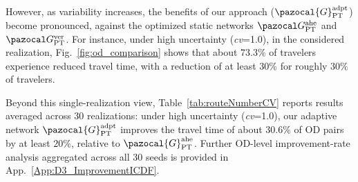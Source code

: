 \documentclass[a4paper,fleqn]{cas-sc}
\begin{document}
However, as variability increases, the benefits of our approach ($\pazocal{G}_{\text{PT}}^{\text{adpt}}$) become pronounced, against the optimized static networks $\pazocal G_\text{PT}^\text{ahe}$ and $\pazocal G_\text{PT}^\text{ver}$.
%
For instance, under high uncertainty (\textit{cv}=1.0), in the considered realization, Fig.~\ref{fig:od_comparison} shows that about $73.3\%$ of travelers experience reduced travel time, with a reduction of at least $30\%$ for roughly $30\%$ of travelers.


%

Beyond this single-realization view, Table~\ref{tab:routeNumberCV} reports results averaged across 30 realizations: under high uncertainty (\textit{cv}=1.0), our adaptive network $\pazocal{G}_{\text{PT}}^{\text{adpt}}$ improves the travel time of about $30.6\%$ of OD pairs by at least $20\%$, relative to $\pazocal{G}_{\text{PT}}^{\text{ahe}}$. Further OD-level improvement-rate analysis aggregated across all 30 seeds is provided in App.~\ref{App:D3_ImprovementICDF}.
\end{document}
